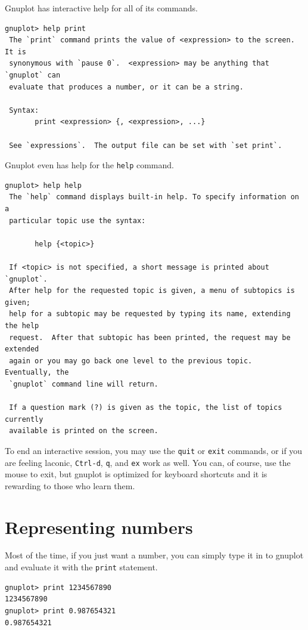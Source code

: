 \documentclass[11pt,letterpaper]{report}
\begin{document}
Gnuplot has interactive help for all of its commands.

\begin{verbatim}
gnuplot> help print
 The `print` command prints the value of <expression> to the screen.  It is
 synonymous with `pause 0`.  <expression> may be anything that `gnuplot` can
 evaluate that produces a number, or it can be a string.

 Syntax:
       print <expression> {, <expression>, ...}

 See `expressions`.  The output file can be set with `set print`.
\end{verbatim}

Gnuplot even has help for the \lstinline+help+ command.

\begin{verbatim}
gnuplot> help help
 The `help` command displays built-in help. To specify information on a
 particular topic use the syntax:

       help {<topic>}

 If <topic> is not specified, a short message is printed about `gnuplot`.
 After help for the requested topic is given, a menu of subtopics is given;
 help for a subtopic may be requested by typing its name, extending the help
 request.  After that subtopic has been printed, the request may be extended
 again or you may go back one level to the previous topic.  Eventually, the
 `gnuplot` command line will return.

 If a question mark (?) is given as the topic, the list of topics currently
 available is printed on the screen.

\end{verbatim}

To end an interactive session, you may use the \lstinline+quit+ or \lstinline+exit+ commands, or if you are feeling laconic, \lstinline+Ctrl-d+, \lstinline+q+, and \lstinline+ex+ work as well. You can, of course, use the mouse to exit, but gnuplot is optimized for keyboard shortcuts and it is rewarding to those who learn them.


\chapter{Representing numbers}
Most of the time, if you just want a number, you can simply type it in to gnuplot and evaluate it with the \verb+print+ statement.
\begin{lstlisting}
gnuplot> print 1234567890
1234567890
gnuplot> print 0.987654321
0.987654321
\end{lstlisting}
\end{document}
